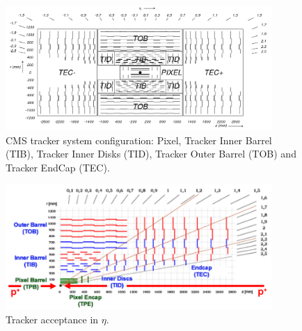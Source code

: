 %

\begin{figure}[!Hhtbp]
  \begin{center}
    \includegraphics[width=0.9\textwidth]{figs/fig_cmstracker.png}
    \caption{CMS tracker system configuration: Pixel, Tracker Inner Barrel (TIB), Tracker Inner Disks (TID), Tracker Outer Barrel (TOB) and Tracker EndCap (TEC).}
    \label{fig:cmstracker}
  \end{center}
\end{figure}

\begin{figure}[!Hhtbp]
  \begin{center}
    \includegraphics[width=0.9\textwidth]{figs/tracker_resolution.png}
    \caption{Tracker acceptance in $\eta$. }
    \label{fig:trackerres}
  \end{center}
\end{figure}

